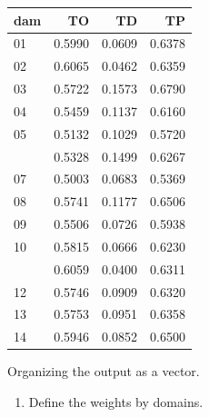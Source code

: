 \documentclass[
  12pt,
]{book}
\newenvironment{Shaded}{\begin{snugshade}}{\end{snugshade}}
\newcommand{\AttributeTok}[1]{\textcolor[rgb]{0.13,0.29,0.53}{#1}}
\newcommand{\FunctionTok}[1]{\textcolor[rgb]{0.13,0.29,0.53}{\textbf{#1}}}
\newcommand{\NormalTok}[1]{#1}
\newcommand{\OtherTok}[1]{\textcolor[rgb]{0.56,0.35,0.01}{#1}}
\newcommand{\SpecialCharTok}[1]{\textcolor[rgb]{0.81,0.36,0.00}{\textbf{#1}}}
\newcommand{\StringTok}[1]{\textcolor[rgb]{0.31,0.60,0.02}{#1}}
\providecommand{\tightlist}{%
  \setlength{\itemsep}{0pt}\setlength{\parskip}{0pt}}
\begin{document}
\begin{table}[H]
\centering
\centering
\begin{tabular}[t]{lrrr}
\toprule
dam & TO & TD & TP\\
\midrule
01 & 0.5990 & 0.0609 & 0.6378\\
02 & 0.6065 & 0.0462 & 0.6359\\
03 & 0.5722 & 0.1573 & 0.6790\\
04 & 0.5459 & 0.1137 & 0.6160\\
05 & 0.5132 & 0.1029 & 0.5720\\
\addlinespace
06 & 0.5328 & 0.1499 & 0.6267\\
07 & 0.5003 & 0.0683 & 0.5369\\
08 & 0.5741 & 0.1177 & 0.6506\\
09 & 0.5506 & 0.0726 & 0.5938\\
10 & 0.5815 & 0.0666 & 0.6230\\
\addlinespace
11 & 0.6059 & 0.0400 & 0.6311\\
12 & 0.5746 & 0.0909 & 0.6320\\
13 & 0.5753 & 0.0951 & 0.6358\\
14 & 0.5946 & 0.0852 & 0.6500\\
\bottomrule
\end{tabular}
\end{table}

Organizing the output as a vector.

\begin{Shaded}
\end{Shaded}

\begin{enumerate}
\def\labelenumi{\arabic{enumi}.}
\setcounter{enumi}{2}
\tightlist
\item
  Define the weights by domains.
\end{enumerate}
\end{document}
